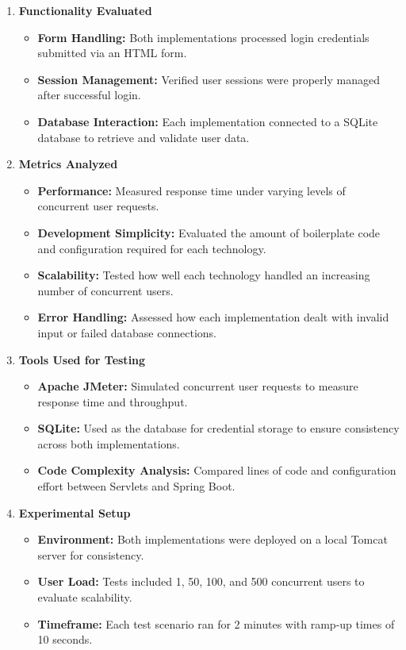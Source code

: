 \begin{enumerate}
    \item \textbf{Functionality Evaluated}
    \begin{itemize}
        \item \textbf{Form Handling:} Both implementations processed login credentials submitted via an HTML form.
        \item \textbf{Session Management:} Verified user sessions were properly managed after successful login.
        \item \textbf{Database Interaction:} Each implementation connected to a SQLite database to retrieve and validate user data.
    \end{itemize}

    \item \textbf{Metrics Analyzed}
    \begin{itemize}
        \item \textbf{Performance:} Measured response time under varying levels of concurrent user requests.
        \item \textbf{Development Simplicity:} Evaluated the amount of boilerplate code and configuration required for each technology.
        \item \textbf{Scalability:} Tested how well each technology handled an increasing number of concurrent users.
        \item \textbf{Error Handling:} Assessed how each implementation dealt with invalid input or failed database connections.
    \end{itemize}

    \item \textbf{Tools Used for Testing}
    \begin{itemize}
        \item \textbf{Apache JMeter:} Simulated concurrent user requests to measure response time and throughput.
        \item \textbf{SQLite:} Used as the database for credential storage to ensure consistency across both implementations.
        \item \textbf{Code Complexity Analysis:} Compared lines of code and configuration effort between Servlets and Spring Boot.
    \end{itemize}

    \item \textbf{Experimental Setup}
    \begin{itemize}
        \item \textbf{Environment:} Both implementations were deployed on a local Tomcat server for consistency.
        \item \textbf{User Load:} Tests included 1, 50, 100, and 500 concurrent users to evaluate scalability.
        \item \textbf{Timeframe:} Each test scenario ran for 2 minutes with ramp-up times of 10 seconds.
    \end{itemize}
\end{enumerate}

